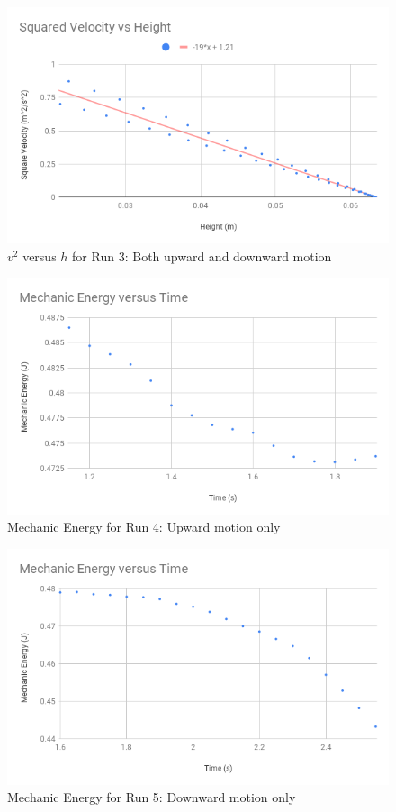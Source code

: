 \begin{figure}[ht]
    \centering
    \includegraphics[scale=0.71]{image/07-mechanic/v2-both.png}
    \caption{$v^{2}$ versus $h$ for Run 3: Both upward and downward motion}
    \label{figure:07.v2.3}
\end{figure}
%
\begin{figure}[ht]
    \centering
    \includegraphics[scale=0.71]{image/07-mechanic/energy-4.png}
    \caption{Mechanic Energy for Run 4: Upward motion only}
    \label{figure.07.run.4.e}
\end{figure}
%
\begin{figure}[ht]
    \centering
    \includegraphics[scale=0.71]{image/07-mechanic/energy-5.png}
    \caption{Mechanic Energy for Run 5: Downward motion only}
    \label{figure.07.run.5.e}
\end{figure}
